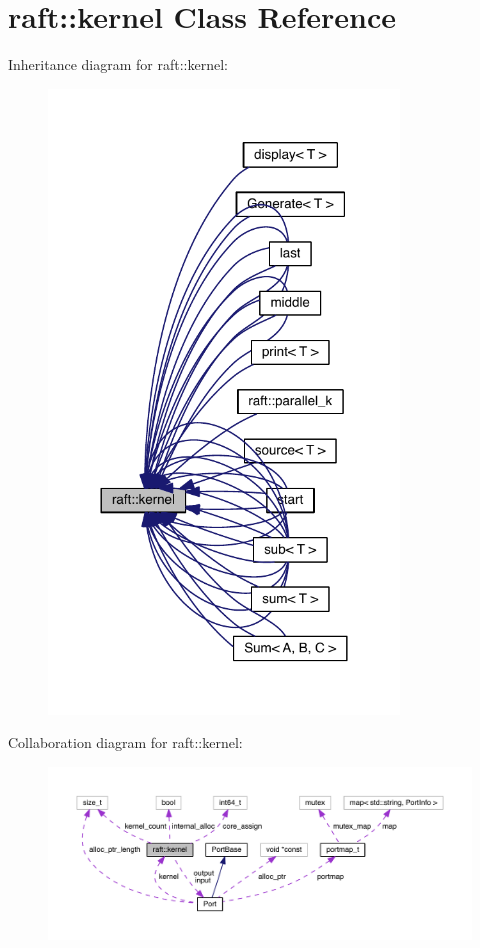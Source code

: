 \hypertarget{classraft_1_1kernel}{}\section{raft\+:\+:kernel Class Reference}
\label{classraft_1_1kernel}


Inheritance diagram for raft\+:\+:kernel\+:
\nopagebreak
\begin{figure}[H]
\begin{center}
\leavevmode
\includegraphics[width=264pt]{classraft_1_1kernel__inherit__graph}
\end{center}
\end{figure}


Collaboration diagram for raft\+:\+:kernel\+:
\nopagebreak
\begin{figure}[H]
\begin{center}
\leavevmode
\includegraphics[width=350pt]{classraft_1_1kernel__coll__graph}
\end{center}
\end{figure}
